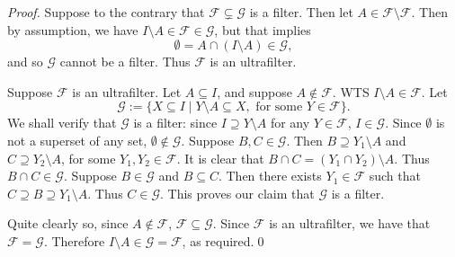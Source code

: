 \documentclass[notoc,notitlepage]{tufte-book}
\begin{document}
\begin{proof}
  \hlbnoted{$(\impliedby)$} Suppose to the contrary that $\mathcal{F} \subsetneq \mathcal{G}$ is a filter. Then let $A \in \mathcal{F} \setminus \mathcal{F}$. Then by assumption, we have $I \setminus A \in \mathcal{F} \in \mathcal{G}$, but that implies
  \begin{equation*}
    \emptyset = A \cap (I \setminus A) \in \mathcal{G},
  \end{equation*}
  and so $\mathcal{G}$ cannot be a filter. Thus $\mathcal{F}$ is an ultrafilter.

  \noindent\hlbnoted{$(\implies)$} Suppose $\mathcal{F}$ is an ultrafilter. Let $A \subseteq I$, and suppose $A \notin \mathcal{F}$. WTS $I \setminus A \in \mathcal{F}$. Let
  \begin{equation*}
    \mathcal{G} := \{ X \subseteq I \mid Y \setminus A \subseteq X, \text{ for some } Y \in \mathcal{F} \}.
  \end{equation*}
  We shall verify that $\mathcal{G}$ is a filter: since $I \supseteq Y \setminus A$ for any $Y \in \mathcal{F}$, $I \in \mathcal{G}$. Since $\emptyset$ is not a superset of any set, $\emptyset \notin \mathcal{G}$. Suppose $B, C \in \mathcal{G}$. Then $B \supseteq Y_1 \setminus A$ and $C \supseteq Y_2 \setminus A$, for some $Y_1, Y_2 \in \mathcal{F}$. It is clear that $B \cap C = (Y_1 \cap Y_2) \setminus A$. Thus $B \cap C \in \mathcal{G}$. Suppose $B \in \mathcal{G}$ and $B \subseteq C$. Then there exists $Y_1 \in \mathcal{F}$ such that $C \supseteq B \supseteq Y_1 \setminus A$. Thus $C \in \mathcal{G}$. This proves our claim that $\mathcal{G}$ is a filter.

  Quite clearly so, since $A \notin \mathcal{F}$, $\mathcal{F} \subseteq \mathcal{G}$. Since $\mathcal{F}$ is an ultrafilter, we have that $\mathcal{F} = \mathcal{G}$. Therefore $I \setminus A \in \mathcal{G} = \mathcal{F}$, as required.\qed\
\end{proof}




\appendix

\backmatter\

\pagestyle{plain}



\printindex
\end{document}
